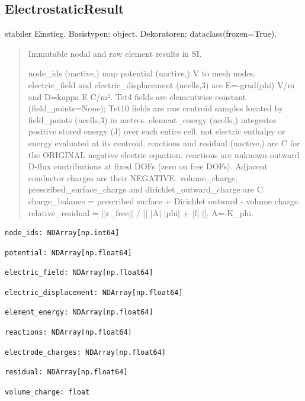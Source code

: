 \subsection{ElectrostaticResult}
stabiler Einstieg.
Basistypen: object. Dekoratoren: dataclass(frozen=True).
\begin{quote}
Immutable nodal and raw element results in SI.\par node\_ids (nactive,) map potential (nactive,) V to mesh nodes. electric\_field and electric\_displacement (ncells,3) are E=-grad(phi) V/m and D=kappa E C/m². Tet4 fields are elementwise constant (field\_points=None); Tet10 fields are raw centroid samples located by field\_points (ncells,3) in metres. element\_energy (ncells,) integrates positive stored energy (J) over each entire cell, not electric enthalpy or energy evaluated at its centroid. reactions and residual (nactive,) are C for the ORIGINAL negative electric equation. reactions are unknown outward D-flux contributions at fixed DOFs (zero on free DOFs). Adjacent conductor charges are their NEGATIVE. volume\_charge, prescribed\_surface\_charge and dirichlet\_outward\_charge are C. charge\_balance = prescribed surface + Dirichlet outward - volume charge. relative\_residual = ||r\_free|| / || |A| |phi| + |f| ||, A=-K\_phi.
\end{quote}
\begin{lstlisting}
node_ids: NDArray[np.int64]
\end{lstlisting}
\begin{lstlisting}
potential: NDArray[np.float64]
\end{lstlisting}
\begin{lstlisting}
electric_field: NDArray[np.float64]
\end{lstlisting}
\begin{lstlisting}
electric_displacement: NDArray[np.float64]
\end{lstlisting}
\begin{lstlisting}
element_energy: NDArray[np.float64]
\end{lstlisting}
\begin{lstlisting}
reactions: NDArray[np.float64]
\end{lstlisting}
\begin{lstlisting}
electrode_charges: NDArray[np.float64]
\end{lstlisting}
\begin{lstlisting}
residual: NDArray[np.float64]
\end{lstlisting}
\begin{lstlisting}
volume_charge: float
\end{lstlisting}
